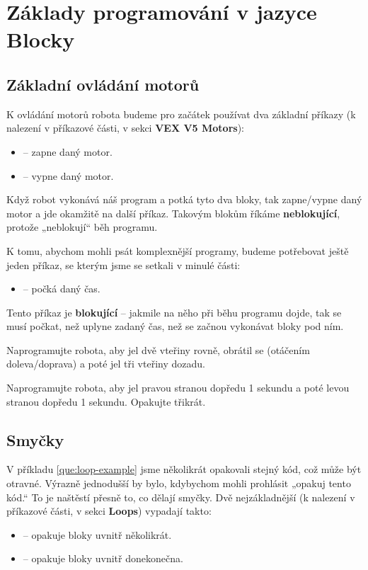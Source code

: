 \documentclass[../main.tex]{subfiles}
\begin{document}
	\section{Základy programování v jazyce Blocky}

	\subsection{Základní ovládání motorů}
	K ovládání motorů robota budeme pro začátek používat dva základní příkazy (k nalezení v příkazové části, v sekci \textbf{VEX V5 Motors}):
	\begin{itemize}
		\item[\block]  -- zapne daný motor.
		\item[\block]  -- vypne daný motor.
	\end{itemize}

	Když robot vykonává náš program a potká tyto dva bloky, tak zapne/vypne daný motor a jde okamžitě na další příkaz. Takovým blokům říkáme \textbf{neblokující}, protože „neblokují“ běh programu.

	K tomu, abychom mohli psát komplexnější programy, budeme potřebovat ještě jeden příkaz, se kterým jsme se setkali v minulé části:
	\begin{itemize}
		\item[\block]  -- počká daný čas.
	\end{itemize}

	Tento příkaz je \textbf{blokující} -- jakmile na něho při běhu programu dojde, tak se musí počkat, než uplyne zadaný čas, než se začnou vykonávat bloky pod ním.

	\begin{question}
		Naprogramujte robota, aby jel dvě vteřiny rovně, obrátil se (otáčením doleva/doprava) a poté jel tři vteřiny dozadu.
	\end{question}

	\begin{question}\label{que:loop-example}%
		Naprogramujte robota, aby jel pravou stranou dopředu 1 sekundu a poté levou stranou dopředu 1 sekundu. Opakujte třikrát.
	\end{question}

	\subsection{Smyčky}
	V příkladu \ref{que:loop-example} jsme několikrát opakovali stejný kód, což může být otravné. Výrazně jednodušší by bylo, kdybychom mohli prohlásit „opakuj tento kód.“ To je naštěstí přesně to, co dělají smyčky. Dvě nejzákladnější (k nalezení v příkazové části, v sekci \textbf{Loops}) vypadají takto:
	\begin{itemize}
		\item[\block]  -- opakuje bloky uvnitř několikrát.
		\item[\block]  -- opakuje bloky uvnitř donekonečna.
	\end{itemize}
\end{document}
